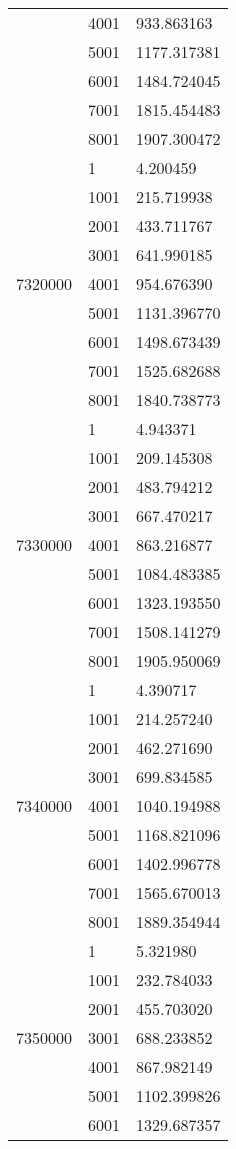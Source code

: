 \begin{table}[htb!]
\begin{tabular}{lll}
 & 4001 & 933.863163 \\
 & 5001 & 1177.317381 \\
 & 6001 & 1484.724045 \\
 & 7001 & 1815.454483 \\
 & 8001 & 1907.300472 \\
\multirow[c]{9}{*}{7320000} & 1 & 4.200459 \\
 & 1001 & 215.719938 \\
 & 2001 & 433.711767 \\
 & 3001 & 641.990185 \\
 & 4001 & 954.676390 \\
 & 5001 & 1131.396770 \\
 & 6001 & 1498.673439 \\
 & 7001 & 1525.682688 \\
 & 8001 & 1840.738773 \\
\multirow[c]{9}{*}{7330000} & 1 & 4.943371 \\
 & 1001 & 209.145308 \\
 & 2001 & 483.794212 \\
 & 3001 & 667.470217 \\
 & 4001 & 863.216877 \\
 & 5001 & 1084.483385 \\
 & 6001 & 1323.193550 \\
 & 7001 & 1508.141279 \\
 & 8001 & 1905.950069 \\
\multirow[c]{9}{*}{7340000} & 1 & 4.390717 \\
 & 1001 & 214.257240 \\
 & 2001 & 462.271690 \\
 & 3001 & 699.834585 \\
 & 4001 & 1040.194988 \\
 & 5001 & 1168.821096 \\
 & 6001 & 1402.996778 \\
 & 7001 & 1565.670013 \\
 & 8001 & 1889.354944 \\
\multirow[c]{9}{*}{7350000} & 1 & 5.321980 \\
 & 1001 & 232.784033 \\
 & 2001 & 455.703020 \\
 & 3001 & 688.233852 \\
 & 4001 & 867.982149 \\
 & 5001 & 1102.399826 \\
 & 6001 & 1329.687357 \\

\end{tabular}
\end{table}
